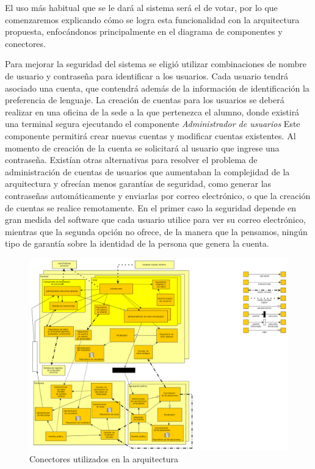 El uso más habitual que se le dará al sistema será el de votar, por lo que comenzaremos explicando cómo se logra esta funcionalidad con la arquitectura propuesta, enfocándonos principalmente en el diagrama de componentes y conectores.


Para mejorar la seguridad del sistema se eligió utilizar combinaciones de nombre de usuario y contraseña para identificar a los usuarios. Cada usuario tendrá asociado una cuenta, que contendrá además de la información de identificación la preferencia de lenguaje. La creación de cuentas para los usuarios se deberá realizar en una oficina de la sede a la que pertenezca el alumno, donde existirá una terminal segura ejecutando el componente \emph{Administrador de usuarios} Este componente permitirá crear nuevas cuentas y modificar cuentas existentes. Al momento de creación de la cuenta se solicitará al usuario que ingrese una contraseña. Existían otras alternativas para resolver el problema de administración de cuentas de usuarios que aumentaban la complejidad de la arquitectura y ofrecían menos garantías de seguridad, como generar las contraseñas automáticamente y enviarlas por correo electrónico, o que la creación de cuentas se realice remotamente. En el primer caso la seguridad depende en gran medida del software que cada usuario utilice para ver su correo electrónico, mientras que la segunda opción no ofrece, de la manera que la pensamos, ningún tipo de garantía sobre la identidad de la persona que genera la cuenta.


\begin{figure}[H]
	\begin{center}
		\includegraphics[scale=0.5]{../informe/imagenes/arq1.png}
	\end{center} 
	\caption{Conectores utilizados en la arquitectura}
	\label{fig:tiposConector}
\end{figure}

